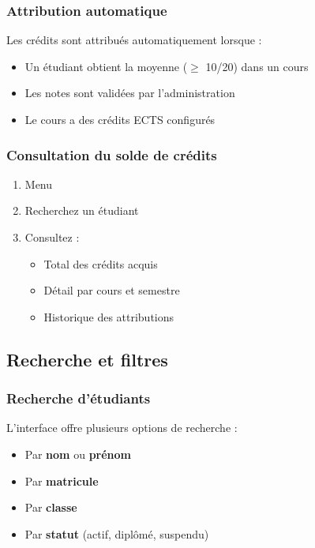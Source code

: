 \subsubsection{Attribution automatique}

Les crédits sont attribués automatiquement lorsque :
\begin{itemize}[leftmargin=*]
    \item Un étudiant obtient la moyenne ($\geq$ 10/20) dans un cours
    \item Les notes sont validées par l'administration
    \item Le cours a des crédits ECTS configurés
\end{itemize}

\subsubsection{Consultation du solde de crédits}

\begin{enumerate}[leftmargin=*]
    \item Menu 
    \item Recherchez un étudiant
    \item Consultez :
    \begin{itemize}
        \item Total des crédits acquis
        \item Détail par cours et semestre
        \item Historique des attributions
    \end{itemize}
\end{enumerate}


\subsection{Recherche et filtres}

\subsubsection{Recherche d'étudiants}

L'interface offre plusieurs options de recherche :

\begin{itemize}[leftmargin=*]
    \item Par \textbf{nom} ou \textbf{prénom}
    \item Par \textbf{matricule}
    \item Par \textbf{classe}
    \item Par \textbf{statut} (actif, diplômé, suspendu)
\end{itemize}

